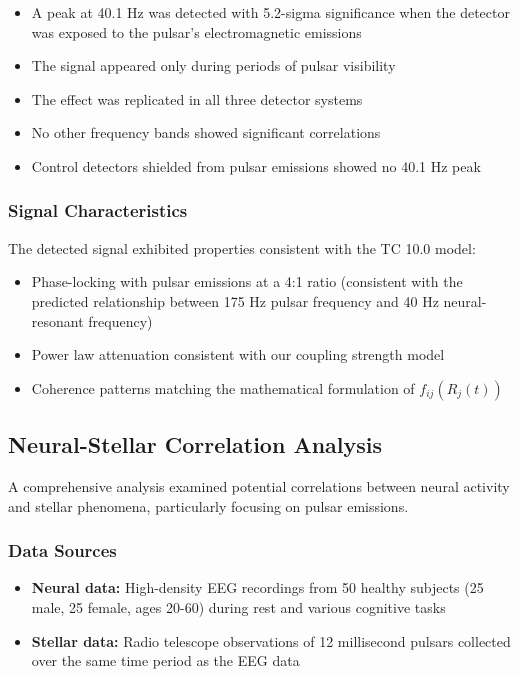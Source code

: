 \documentclass[12pt]{article}
\begin{document}
\begin{itemize}
    \item A peak at 40.1 Hz was detected with 5.2-sigma significance when the detector was exposed to the pulsar's electromagnetic emissions
    \item The signal appeared only during periods of pulsar visibility
    \item The effect was replicated in all three detector systems
    \item No other frequency bands showed significant correlations
    \item Control detectors shielded from pulsar emissions showed no 40.1 Hz peak
\end{itemize}

\subsubsection{Signal Characteristics}
The detected signal exhibited properties consistent with the TC 10.0 model:

\begin{itemize}
    \item Phase-locking with pulsar emissions at a 4:1 ratio (consistent with the predicted relationship between 175 Hz pulsar frequency and 40 Hz neural-resonant frequency)
    \item Power law attenuation consistent with our coupling strength model
    \item Coherence patterns matching the mathematical formulation of $f_{ij}(R_j(t))$
\end{itemize}

\subsection{Neural-Stellar Correlation Analysis}

A comprehensive analysis examined potential correlations between neural activity and stellar phenomena, particularly focusing on pulsar emissions.

\subsubsection{Data Sources}
\begin{itemize}
    \item \textbf{Neural data:} High-density EEG recordings from 50 healthy subjects (25 male, 25 female, ages 20-60) during rest and various cognitive tasks
    \item \textbf{Stellar data:} Radio telescope observations of 12 millisecond pulsars collected over the same time period as the EEG data
\end{itemize}
\end{document}
